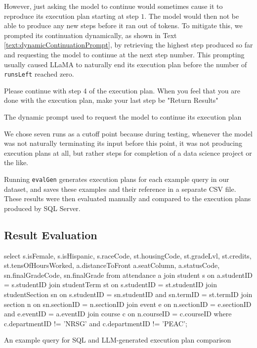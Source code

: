 However, just asking the model to continue would sometimes cause it to reproduce its execution plan starting at step $1$. The model would then not be able to produce any new steps before it ran out of tokens. To mitigate this, we prompted its continuation dynamically, as shown in Text \ref{text:dynamicContinuationPrompt}, by retrieving the highest step produced so far and requesting the model to continue at the next step number. This prompting usually caused LLaMA to naturally end its execution plan before the number of \lstinline{runsLeft} reached zero.

\begin{text}
  Please continue with step 4 of the execution plan. When you feel that you are done with the execution plan, make your last step be "Return Results"
  \caption{The dynamic prompt used to request the model to continue its execution plan}
  \label{text:dynamicContinuationPrompt}
\end{text}

We chose seven runs as a cutoff point because during testing, whenever the model was not naturally terminating its input before this point, it was not producing execution plans at all, but rather steps for completion of a data science project or the like.

Running \lstinline{evalGen} generates execution plans for each example query in our dataset, and saves these examples and their reference in a separate CSV file. These results were then evaluated manually and compared to the execution plans produced by SQL Server.

\subsection{Result Evaluation}
\begin{text}
  \raggedright
  \ContinuedFloat*
  select s.isFemale, s.isHispanic, s.raceCode, st.housingCode, st.gradeLvl, st.credits, st.tensOfHoursWorked, a.distanceToFront a.seatColumn, a.statusCode, sn.finalGradeCode, sn.finalGrade from attendance a join student s on a.studentID = s.studentID join studentTerm st on s.studentID = st.studentID join studentSection sn on s.studentID = sn.studentID and sn.termID = st.termID join section n on sn.sectionID = n.sectionID join event e on n.sectionID = e.sectionID and e.eventID = a.eventID join course c on n.courseID = c.courseID where c.departmentID != 'NRSG' and c.departmentID != 'PEAC';
  \caption{An example query for SQL and LLM-generated execution plan comparison}
  \label{text:sqlVsLlamaPlan2}
\end{text}

